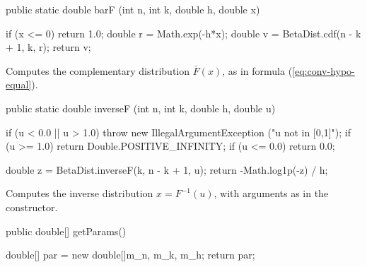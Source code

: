 \begin{code}

   public static double barF (int n, int k, double h, double x)\begin{hide} {
      if (x <= 0)
         return 1.0;
      double r = Math.exp(-h*x);
      double v = BetaDist.cdf(n - k + 1, k, r);
      return v;
   }\end{hide}
\end{code}
\begin{tabb}
  Computes the complementary distribution $\bar F(x)$,
  as in formula (\ref{eq:conv-hypo-equal}).
 \end{tabb}
\begin{htmlonly}
\end{htmlonly}
\begin{code}

   public static double inverseF (int n, int k, double h, double u)\begin{hide} {
      if (u < 0.0 || u > 1.0)
          throw new IllegalArgumentException ("u not in [0,1]");
      if (u >= 1.0)
          return Double.POSITIVE_INFINITY;
      if (u <= 0.0)
          return 0.0;

      double z = BetaDist.inverseF(k, n - k + 1, u);
      return -Math.log1p(-z) / h;
   }\end{hide}
\end{code}
\begin{tabb} Computes the inverse distribution $x=F^{-1}(u)$,
 with arguments as in the constructor.
\end{tabb}
\begin{htmlonly}
\end{htmlonly}
\begin{code}

   public double[] getParams()\begin{hide} {
      double[] par = new double[]{m_n, m_k, m_h};
      return par;
   }\end{hide}
\end{code}
